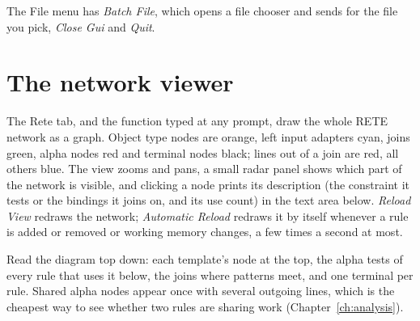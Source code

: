 The File menu has \emph{Batch File}, which opens a file chooser and
sends  for the file you pick, \emph{Close Gui} and
\emph{Quit}.

\section{The network viewer}

The Rete tab, and the  function typed at any prompt, draw the
whole RETE network as a graph. Object type nodes are orange, left input
adapters cyan, joins green, alpha nodes red and terminal nodes black;
lines out of a join are red, all others blue. The view zooms and pans, a
small radar panel shows which part of the network is visible, and
clicking a node prints its description (the constraint it tests or the
bindings it joins on, and its use count) in the text area below.
\emph{Reload View} redraws the network; \emph{Automatic Reload} redraws
it by itself whenever a rule is added or removed or working memory
changes, a few times a second at most.

Read the diagram top down: each template's node at the top, the alpha
tests of every rule that uses it below, the joins where patterns meet,
and one terminal per rule. Shared alpha nodes appear once with several
outgoing lines, which is the cheapest way to see whether two rules are
sharing work (Chapter~\ref{ch:analysis}).
